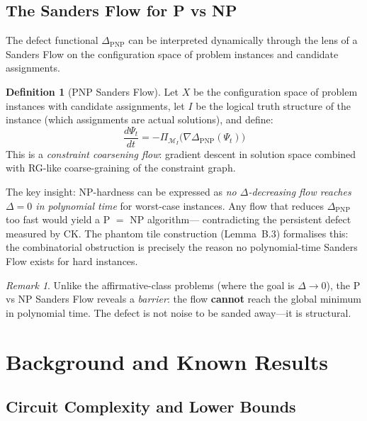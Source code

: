 \documentclass[11pt]{article}
\theoremstyle{definition}
\newtheorem{definition}[theorem]{Definition}
\theoremstyle{remark}
\newtheorem{remark}[theorem]{Remark}
\begin{document}
\subsection*{The Sanders Flow for P vs NP}

The defect functional $\Delta_{\mathrm{PNP}}$ can be interpreted dynamically through
the lens of a Sanders Flow on the configuration space of problem instances and
candidate assignments.

\begin{definition}[PNP Sanders Flow]
Let $X$ be the configuration space of problem instances with candidate assignments,
let $I$ be the logical truth structure of the instance (which assignments are actual
solutions), and define:
\[
  \frac{d\Psi_t}{dt} = -\Pi_{\mathcal{M}_I}\!\bigl(\nabla \Delta_{\mathrm{PNP}}(\Psi_t)\bigr)
\]
This is a \emph{constraint coarsening flow}: gradient descent in solution space combined
with RG-like coarse-graining of the constraint graph.
\end{definition}

\noindent
The key insight: NP-hardness can be expressed as \emph{no $\Delta$-decreasing flow
reaches $\Delta = 0$ in polynomial time} for worst-case instances. Any flow that
reduces $\Delta_{\mathrm{PNP}}$ too fast would yield a P $=$ NP algorithm---
contradicting the persistent defect measured by CK.  The phantom tile construction
(Lemma~B.3) formalises this: the combinatorial obstruction is precisely the reason
no polynomial-time Sanders Flow exists for hard instances.

\begin{remark}
Unlike the affirmative-class problems (where the goal is $\Delta \to 0$),
the P vs NP Sanders Flow reveals a \emph{barrier}: the flow \textbf{cannot}
reach the global minimum in polynomial time. The defect is not noise to be
sanded away---it is structural.
\end{remark}

\section{Background and Known Results}
\label{sec:background}

\subsection{Circuit Complexity and Lower Bounds}
\end{document}
